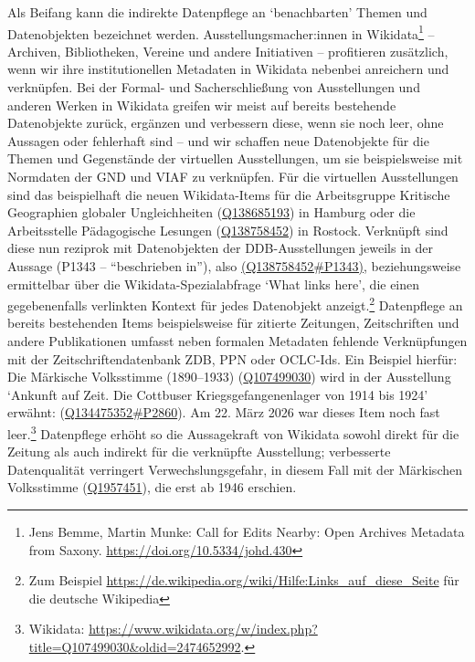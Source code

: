 \documentclass[a4paper,
fontsize=11pt,
oneside,
numbers=noperiodatend,
parskip=half-,
bibliography=totoc,
final
]{scrartcl}
\begin{document}
Als Beifang kann die indirekte Datenpflege an \enquote*{benachbarten}
Themen und Datenobjekten bezeichnet werden. Ausstellungsmacher:innen in
Wikidata\footnote{Jens Bemme, Martin Munke: Call for Edits Nearby: Open
  Archives Metadata from Saxony. \url{https://doi.org/10.5334/johd.430}}
-- Archiven, Bibliotheken, Vereine und andere Initiativen -- profitieren
zusätzlich, wenn wir ihre institutionellen Metadaten in Wikidata
nebenbei anreichern und verknüpfen. Bei der Formal- und Sacherschließung
von Ausstellungen und anderen Werken in Wikidata greifen wir meist auf
bereits bestehende Datenobjekte zurück, ergänzen und verbessern diese,
wenn sie noch leer, ohne Aussagen oder fehlerhaft sind -- und wir
schaffen neue Datenobjekte für die Themen und Gegenstände der virtuellen
Ausstellungen, um sie beispielsweise mit Normdaten der GND und VIAF zu
verknüpfen. Für die virtuellen Ausstellungen sind das beispielhaft die
neuen Wikidata-Items für die Arbeitsgruppe Kritische Geographien
globaler Ungleichheiten
(\href{http://www.wikidata.org/entity/Q138685193}{Q138685193}) in
Hamburg oder die Arbeitsstelle Pädagogische Lesungen
(\href{http://www.wikidata.org/entity/Q138758452}{Q138758452}) in
Rostock. Verknüpft sind diese nun reziprok mit Datenobjekten der
DDB-Ausstellungen jeweils in der Aussage (P1343 -- \enquote{beschrieben
in}), also
\href{https://www.wikidata.org/wiki/Q138758452\#P1343}{(Q138758452\#P1343)},
beziehungsweise ermittelbar über die Wikidata-Spezialabfrage
\enquote*{What links here}, die einen gegebenenfalls verlinkten Kontext
für jedes Datenobjekt anzeigt.\footnote{Zum Beispiel
  \url{https://de.wikipedia.org/wiki/Hilfe:Links_auf_diese_Seite} für
  die deutsche Wikipedia} Datenpflege an bereits bestehenden Items
beispielsweise für zitierte Zeitungen, Zeitschriften und andere
Publikationen umfasst neben formalen Metadaten fehlende Verknüpfungen
mit der Zeitschriftendatenbank ZDB, PPN oder OCLC-Ids. Ein Beispiel
hierfür: Die Märkische Volksstimme (1890--1933)
(\href{http://www.wikidata.org/entity/Q107499030}{Q107499030}) wird in
der Ausstellung \enquote*{Ankunft auf Zeit. Die Cottbuser
Kriegsgefangenenlager von 1914 bis 1924} erwähnt:
(\href{https://www.wikidata.org/wiki/Q134475352\#P2860}{Q134475352\#P2860}).
Am 22. März 2026 war dieses Item noch fast leer.\footnote{Wikidata:
  \url{https://www.wikidata.org/w/index.php?title=Q107499030\&oldid=2474652992}.}
Datenpflege erhöht so die Aussagekraft von Wikidata sowohl direkt für
die Zeitung als auch indirekt für die verknüpfte Ausstellung;
verbesserte Datenqualität verringert Verwechslungsgefahr, in diesem Fall
mit der Märkischen Volksstimme
(\href{http://www.wikidata.org/entity/Q107499030}{Q1957451}), die erst
ab 1946 erschien.
\end{document}
